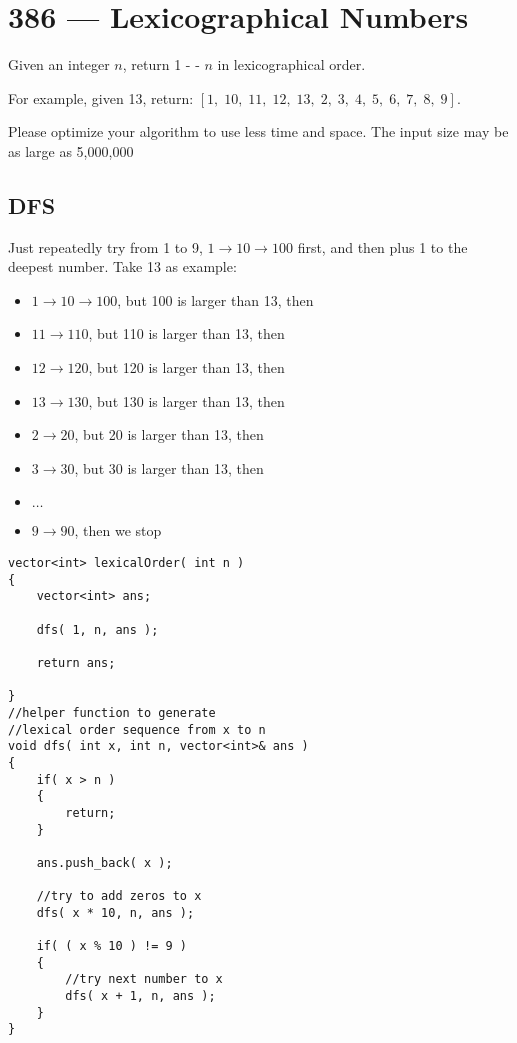 \section{386 --- Lexicographical Numbers}
Given an integer $n$, return 1 - - $n$ in lexicographical order.
\par
For example, given 13, return: $[1,\;10,\;11,\;12,\;13,\;2,\;3,\;4,\;5,\;6,\;7,\;8,\;9]$.
\par
Please optimize your algorithm to use less time and space. The input size may be as large as 5,000,000

\subsection{DFS}
Just repeatedly try from 1 to 9, $1 \to 10 \to 100$ first, and then plus 1 to the deepest number. Take 13 as example:
\begin{itemize}
\item $1\to 10 \to 100$, but 100 is larger than 13, then
\item $11\to 110$, but 110 is larger than 13, then
\item $12\to 120$, but 120 is larger than 13, then
\item $13\to 130$, but 130 is larger than 13, then
\item $2 \to 20$, but 20 is larger than 13, then
\item $3 \to 30$, but 30 is larger than 13, then
\item $\ldots$
\item $9\to 90$, then we stop
\end{itemize}

\setcounter{lstlisting}{0}
\begin{lstlisting}[style=customc, caption={DFS}]
vector<int> lexicalOrder( int n )
{
    vector<int> ans;

    dfs( 1, n, ans );

    return ans;

}
//helper function to generate
//lexical order sequence from x to n
void dfs( int x, int n, vector<int>& ans )
{
    if( x > n )
    {
        return;
    }

    ans.push_back( x );

    //try to add zeros to x
    dfs( x * 10, n, ans );

    if( ( x % 10 ) != 9 )
    {
        //try next number to x
        dfs( x + 1, n, ans );
    }
}
\end{lstlisting}